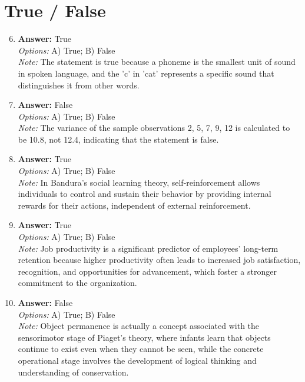 \documentclass[12pt]{article}
\begin{document}
\section*{True / False}
\begin{enumerate}[label=\arabic*.]
\setcounter{enumi}{5}
\item \textbf{Answer:} True
\\ \textit{Options:} A) True; B) False
\\ \textit{Note:} The statement is true because a phoneme is the smallest unit of sound in spoken language, and the 'c' in 'cat' represents a specific sound that distinguishes it from other words.
\item \textbf{Answer:} False
\\ \textit{Options:} A) True; B) False
\\ \textit{Note:} The variance of the sample observations 2, 5, 7, 9, 12 is calculated to be 10.8, not 12.4, indicating that the statement is false.
\item \textbf{Answer:} True
\\ \textit{Options:} A) True; B) False
\\ \textit{Note:} In Bandura's social learning theory, self-reinforcement allows individuals to control and sustain their behavior by providing internal rewards for their actions, independent of external reinforcement.
\item \textbf{Answer:} True
\\ \textit{Options:} A) True; B) False
\\ \textit{Note:} Job productivity is a significant predictor of employees' long-term retention because higher productivity often leads to increased job satisfaction, recognition, and opportunities for advancement, which foster a stronger commitment to the organization.
\item \textbf{Answer:} False
\\ \textit{Options:} A) True; B) False
\\ \textit{Note:} Object permanence is actually a concept associated with the sensorimotor stage of Piaget's theory, where infants learn that objects continue to exist even when they cannot be seen, while the concrete operational stage involves the development of logical thinking and understanding of conservation.
\end{enumerate}
\end{document}
